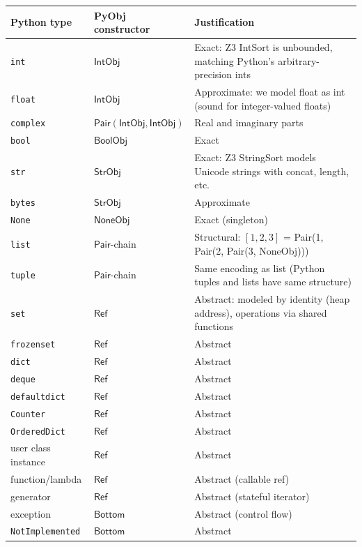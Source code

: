 \begin{center}
\small
\begin{tabular}{l l l}
  \textbf{Python type} & \textbf{PyObj constructor} &
  \textbf{Justification} \\
  \hline
  \texttt{int} & $\mathsf{IntObj}$ & Exact: Z3 IntSort is
    unbounded, matching Python's arbitrary-precision ints \\
  \texttt{float} & $\mathsf{IntObj}$ & Approximate: we model
    float as int (sound for integer-valued floats) \\
  \texttt{complex} & $\mathsf{Pair}(\mathsf{IntObj},
    \mathsf{IntObj})$ & Real and imaginary parts \\
  \texttt{bool} & $\mathsf{BoolObj}$ & Exact \\
  \texttt{str} & $\mathsf{StrObj}$ & Exact: Z3 StringSort
    models Unicode strings with concat, length, etc. \\
  \texttt{bytes} & $\mathsf{StrObj}$ & Approximate \\
  \texttt{None} & $\mathsf{NoneObj}$ & Exact (singleton) \\
  \texttt{list} & $\mathsf{Pair}$-chain & Structural: $[1,2,3]$
    = Pair(1, Pair(2, Pair(3, NoneObj))) \\
  \texttt{tuple} & $\mathsf{Pair}$-chain & Same encoding as
    list (Python tuples and lists have same structure) \\
  \texttt{set} & $\mathsf{Ref}$ & Abstract: modeled by identity
    (heap address), operations via shared functions \\
  \texttt{frozenset} & $\mathsf{Ref}$ & Abstract \\
  \texttt{dict} & $\mathsf{Ref}$ & Abstract \\
  \texttt{deque} & $\mathsf{Ref}$ & Abstract \\
  \texttt{defaultdict} & $\mathsf{Ref}$ & Abstract \\
  \texttt{Counter} & $\mathsf{Ref}$ & Abstract \\
  \texttt{OrderedDict} & $\mathsf{Ref}$ & Abstract \\
  user class instance & $\mathsf{Ref}$ & Abstract \\
  function/lambda & $\mathsf{Ref}$ & Abstract (callable ref) \\
  generator & $\mathsf{Ref}$ & Abstract (stateful iterator) \\
  exception & $\mathsf{Bottom}$ & Abstract (control flow) \\
  \texttt{NotImplemented} & $\mathsf{Bottom}$ & Abstract \\
\end{tabular}
\end{center}


